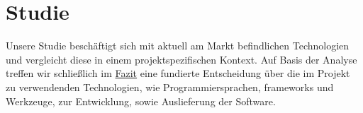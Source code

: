 \chapter{Studie}
Unsere Studie beschäftigt sich mit aktuell am Markt befindlichen Technologien und vergleicht diese in einem projektspezifischen Kontext. Auf Basis der Analyse treffen wir schließlich im \hyperref[sec:fazit]{Fazit} eine fundierte Entscheidung über die im Projekt zu verwendenden Technologien, wie Programmiersprachen, \gls{framework}s und Werkzeuge, zur Entwicklung, sowie Auslieferung der Software.
